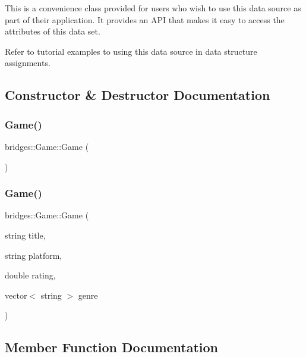 This is a convenience class provided for users who wish to use this data source as part of their application. It provides an A\+PI that makes it easy to access the attributes of this data set.

Refer to tutorial examples to using this data source in data structure assignments. 

\subsection{Constructor \& Destructor Documentation}
\hypertarget{classbridges_1_1_game_a44f625a03ebf144931aa9e7e5440303c}{}\label{classbridges_1_1_game_a44f625a03ebf144931aa9e7e5440303c} 
\subsubsection{\texorpdfstring{Game()}{Game()}\hspace{0.1cm}{\footnotesize\ttfamily [1/2]}}
{\footnotesize\ttfamily bridges\+::\+Game\+::\+Game (\begin{DoxyParamCaption}{ }\end{DoxyParamCaption})\hspace{0.3cm}{\ttfamily [inline]}}

\hypertarget{classbridges_1_1_game_ab8064a35bca85871e7088f351ce86af1}{}\label{classbridges_1_1_game_ab8064a35bca85871e7088f351ce86af1} 
\subsubsection{\texorpdfstring{Game()}{Game()}\hspace{0.1cm}{\footnotesize\ttfamily [2/2]}}
{\footnotesize\ttfamily bridges\+::\+Game\+::\+Game (\begin{DoxyParamCaption}\item[{string}]{title,  }\item[{string}]{platform,  }\item[{double}]{rating,  }\item[{vector$<$ string $>$}]{genre }\end{DoxyParamCaption})\hspace{0.3cm}{\ttfamily [inline]}}



\subsection{Member Function Documentation}
\hypertarget{classbridges_1_1_game_a163f4abb299d588a5987c24e4e7bea05}{}\label{classbridges_1_1_game_a163f4abb299d588a5987c24e4e7bea05} 

